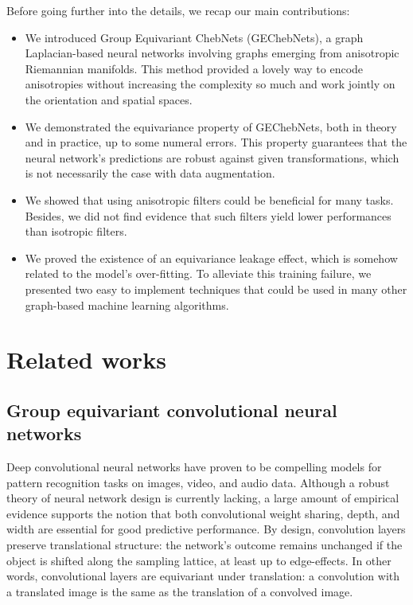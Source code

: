 \documentclass{article}
\begin{document}
Before going further into the details, we recap our main contributions:
\begin{itemize}
\item We introduced Group Equivariant ChebNets (GEChebNets), a graph Laplacian-based neural networks involving graphs emerging from anisotropic Riemannian manifolds. This method provided a lovely way to encode anisotropies without increasing the complexity so much and work jointly on the orientation and spatial spaces.
\item We demonstrated the equivariance property of GEChebNets, both in theory and in practice, up to some numeral errors. This property guarantees that the neural network's predictions are robust against given transformations, which is not necessarily the case with data augmentation.
\item We showed that using anisotropic filters could be beneficial for many tasks. Besides, we did not find evidence that such filters yield lower performances than isotropic filters.
\item We proved the existence of an equivariance leakage effect, which is somehow related to the model's over-fitting. To alleviate this training failure, we presented two easy to implement techniques that could be used in many other graph-based machine learning algorithms.
\end{itemize}

\section{Related works} \label{sec:related_works}

\subsection{Group equivariant convolutional neural networks}

Deep convolutional neural networks \citep{lecun1995convolutional} have proven to be compelling models for pattern recognition tasks on images, video, and audio data. Although a robust theory of neural network design is currently lacking, a large amount of empirical evidence supports the notion that both convolutional weight sharing, depth, and width are essential for good predictive performance. By design, convolution layers preserve translational structure: the network's outcome remains unchanged if the object is shifted along the sampling lattice, at least up to edge-effects. In other words, convolutional layers are equivariant under translation: a convolution with a translated image is the same as the translation of a convolved image.
\end{document}
